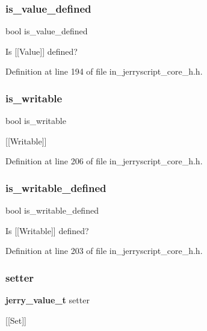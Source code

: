 \subsubsection{is\_value\_defined}
{\footnotesize\ttfamily bool is\+\_\+value\+\_\+defined}

Is [[Value]] defined? 

Definition at line 194 of file in\+\_\+jerryscript\+\_\+core\+\_\+h.\+h.

\mbox{\label{structjerry__property__descriptor__t_a0994b42ff5173646088cf592fe8aaa9c}} 
\subsubsection{is\_writable}
{\footnotesize\ttfamily bool is\+\_\+writable}

[[Writable]] 

Definition at line 206 of file in\+\_\+jerryscript\+\_\+core\+\_\+h.\+h.

\mbox{\label{structjerry__property__descriptor__t_a8a23ee50ecd0e7976b404ac45327ddb0}} 
\subsubsection{is\_writable\_defined}
{\footnotesize\ttfamily bool is\+\_\+writable\+\_\+defined}

Is [[Writable]] defined? 

Definition at line 203 of file in\+\_\+jerryscript\+\_\+core\+\_\+h.\+h.

\mbox{\label{structjerry__property__descriptor__t_ac33197684b4eef21423734085c2b341b}} 
\subsubsection{setter}
{\footnotesize\ttfamily \textbf{ jerry\+\_\+value\+\_\+t} setter}

[[Set]] 


